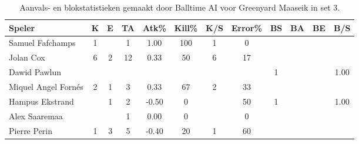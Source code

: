 \begin{table}[ht!]
  \centering
  \scriptsize
  \begin{tabular}{|l|c|c|c|c|c|c|c|c|c|c|c|} \hline
    \textbf{Speler} & K & E & TA & Atk\% & Kill\% & K/S & Error\% & BS & BA & BE & B/S \\ \hline
    Samuel Fafchamps & 1 &  & 1 & 1.00 & 100 & 1 & 0 &  &   &  &  \\
    Jolan Cox & 6 & 2 & 12 & 0.33 & 50 & 6 & 17 &  &   &   & \\
    Dawid Pawlun &   &   &   &   &   &   &   & 1 & & & 1.00 \\
    Miquel Angel Fornés & 2 & 1 & 3 & 0.33 & 67 & 2 & 33 &  &   &  & \\
    Hampus Ekstrand &  & 1 & 2 & -0.50 & 0 &  & 50 & 1 & & & 1.00 \\
    Alex Saaremaa &  &  & 1 & 0.00 & 0 &  & 0 &  & & & \\
    Pierre Perin & 1 & 3 & 5 & -0.40 & 20 & 1 & 60 & &  & &  \\  \hline
  \end{tabular}
  \caption[Aanvals- en blokstatistieken gemaakt door Balltime AI voor Greenyard Maaseik in set 3]{\label{tab:PL3AttBlockMaaseikAI3}Aanvals- en blokstatistieken gemaakt door Balltime AI voor Greenyard Maaseik in set 3.}
\end{table}
